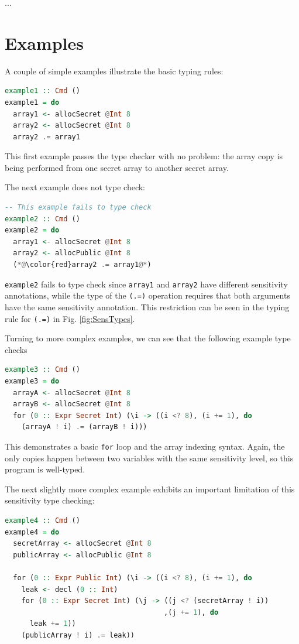 \documentclass[10pt, conference]{IEEEtran}
\newcommand{\ttt}{\texttt}
\begin{document}
...

\section{Examples}
\label{sec:Examples}

A couple of simple examples illustrate the basic typing rules:

\begin{lstlisting}[language=haskell]
example1 :: Cmd ()
example1 = do
  array1 <- allocSecret @Int 8
  array2 <- allocSecret @Int 8
  array2 .= array1
\end{lstlisting}

\noindent This first example passes the type checker with no problem: the array copy
is being performed from one secret array to another secret array.

The next example does not type check:

\begin{lstlisting}[language=haskell]
  -- This example fails to type check
example2 :: Cmd ()
example2 = do
  array1 <- allocSecret @Int 8
  array2 <- allocPublic @Int 8
  (*@\color{red}array2 .= array1@*)
\end{lstlisting}

\noindent \ttt{example2} fails to type check since \ttt{array1} and \ttt{array2} have
different sensitivity annotations, while the type of the \ttt{(.=)} operation
requires that both arguments have the same sensitivity annotation. This restriction can
be seen in the typing rule for \ttt{(.=)} in Fig. \ref{fig:SensTypes}.

Turning to more complex examples, we can see that the following example type checks

\begin{lstlisting}[language=Haskell]
example3 :: Cmd ()
example3 = do
  arrayA <- allocSecret @Int 8
  arrayB <- allocSecret @Int 8
  for (0 :: Expr Secret Int) (\i -> ((i <? 8), (i += 1), do
    (arrayA ! i) .= (arrayB ! i)))
\end{lstlisting}

\noindent This demonstrates a basic \ttt{for} loop and the array indexing syntax. Again, the
only copies happen between two variables with the same sensitivity level, so this
program is well-typed.

The next slightly more complex example exhibits an important limitation of this sensitivity type checking:

\begin{lstlisting}[language=Haskell]
example4 :: Cmd ()
example4 = do
  secretArray <- allocSecret @Int 8
  publicArray <- allocPublic @Int 8

  for (0 :: Expr Public Int) (\i -> ((i <? 8), (i += 1), do
    leak <- decl (0 :: Int)
    for (0 :: Expr Secret Int) (\j -> ((j <? (secretArray ! i))
                                      ,(j += 1), do
      leak += 1))
    (publicArray ! i) .= leak))
\end{lstlisting}
\end{document}
